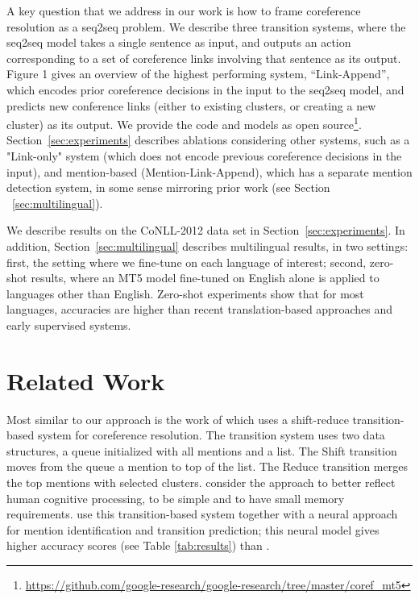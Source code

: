 \documentclass[11pt,a4paper]{article}
\newcommand{\LA}{Link-Append}
\newcommand{\M}{Mention-Link-Append}
\newcommand{\LO}{Link-only}
\begin{document}
A key question that we address in our work is how to frame coreference resolution as a seq2seq problem. We describe three transition systems, where the seq2seq model takes a single sentence as input, and outputs an action corresponding to a set of coreference links involving that sentence as its output. Figure 1 gives an overview of the highest performing system, “\LA”, which encodes prior coreference decisions in the input to the seq2seq model, and predicts new conference links (either to existing clusters, or creating a new cluster) as its output.
We provide the code and models as open source\footnote{\url{https://github.com/google-research/google-research/tree/master/coref_mt5}}.
Section~\ref{sec:experiments} describes ablations considering other systems, such as a "\LO" system (which does not encode previous coreference decisions in the input), and mention-based (\M), which has a separate mention detection system, in some sense mirroring prior work (see Section ~\ref{sec:multilingual}). 

We describe results on the CoNLL-2012 data set in Section~\ref{sec:experiments}.
In addition,  Section~\ref{sec:multilingual} describes multilingual results, in two settings: first, the setting where we fine-tune on each language of interest; second, zero-shot results, where an MT5 model fine-tuned on English alone is applied to languages other than English. 
Zero-shot experiments show that for most languages, accuracies are higher than recent translation-based approaches and early supervised systems. 







 
\section{Related Work}
\label{sec:related}

Most similar to our approach is the work of  which uses a shift-reduce transition-based system for coreference resolution. The transition system uses two data structures, a queue initialized with all mentions and a list. The {\sc Shift} transition moves from the queue a mention to top of the list. The {\sc Reduce} transition merges the top mentions with selected clusters.  consider the approach to better reflect human cognitive processing, to be simple and to have small memory requirements.  use this transition-based system together with a neural approach for mention identification and transition prediction; this neural model \cite{xia-etal-2020-incremental} gives higher accuracy scores (see Table \ref{tab:results}) than . 
\end{document}
